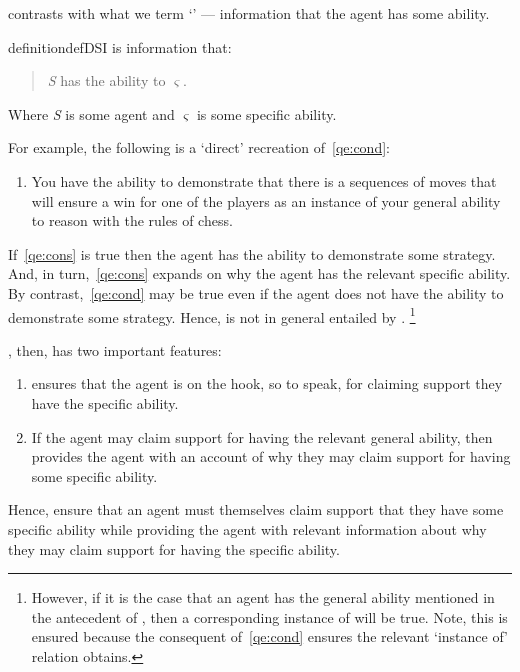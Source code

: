 \begin{note}
   contrasts with what we term `' --- information that the agent has some ability.
    \begin{restatable}[\dsi{}]{definition}{defDSI}\label{def:dsi}
     is information that:
    \begin{quote}
      \emph{S} has the ability to \(\varsigma\).
    \end{quote}
    Where \emph{S} is some agent and \(\varsigma\) is some specific ability.
  \end{restatable}
  For example, the following is a `direct' recreation of~\ref{qe:cond}:

  \begin{enumerate}[label=(\dsi{}:\arabic*), ref=(\dsi{}:\arabic*), series=dsi_count]
  \item\label{qe:cons} You have the ability to demonstrate that there is a sequences of moves that will ensure a win for one of the players as an instance of your general ability to reason with the rules of chess.
  \end{enumerate}

  If~\ref{qe:cons} is true then the agent has the ability to demonstrate some strategy.
  And, in turn,~\ref{qe:cons} expands on why the agent has the relevant specific ability.
  By contrast,~\ref{qe:cond} may be true even if the agent does not have the ability to demonstrate some strategy.
  Hence, \dsi{} is not in general entailed by \gsi{}.\nolinebreak
  \footnote{
    However, if it is the case that an agent has the general ability mentioned in the antecedent of \gsi{}, then a corresponding instance of \dsi{} will be true.
    Note, this is ensured because the consequent of~\ref{qe:cond} ensures the relevant `instance of' relation obtains.
  }
\end{note}

\begin{note}
  \gsi{}, then, has two important features:
  \begin{enumerate}
  \item \gsi{} ensures that the agent is on the hook, so to speak, for claiming support they have the specific ability.
  \item If the agent may claim support for having the relevant general ability, then \gsi{} provides the agent with an account of why they may claim support for having some specific ability.
  \end{enumerate}
  Hence, \gsi{} ensure that an agent must themselves claim support that they have some specific ability while providing the agent with relevant information about why they may claim support for having the specific ability.
\end{note}

